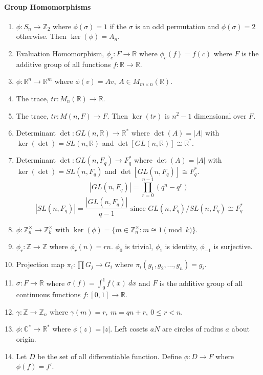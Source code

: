 \paragraph{Group Homomorphisms}
\begin{enumerate}
	\item $\phi : S_n \to \mathbb{Z}_2$ where $\phi(\sigma) = 1$ if the $\sigma$ is an odd permutation and $\phi(\sigma) = 2$ otherwise. Then $\ker(\phi)=A_n$.
	\item Evaluation Homomorphism, $\phi_c : F \to \mathbb{R}$ where $\phi_c(f) = f(c)$ where $F$ is the additive group of all functions $f : \mathbb{R} \to \mathbb{R}$.
	\item $\phi : \mathbb{R}^n \to \mathbb{R}^m$ where $\phi(v) = Av,\ A \in M_{m \times n}(\mathbb{R})$.
	\item The trace, $tr : M_n(\mathbb{R}) \to \mathbb{R}$.
	\item The trace, $tr : M(n,F) \to F$. Then $\ker(tr)$ is $n^2-1$ dimensional over $F$.
	\item Determinant $\det : GL(n,\mathbb{R}) \to \mathbb{R}^\ast$ where $\det(A)=|A|$ with $\ker(\det) = SL(n,\mathbb{R})$ and $\det[GL(n,\mathbb{R})] \cong \mathbb{R}^\ast$.
	\item Determinant $\det : GL(n,F_q) \to F_q^\ast$ where $\det(A)=|A|$ with $\ker(\det) = SL(n,F_q)$ and $\det[GL(n,F_q)] \cong F_q^\ast$.
	$$|GL(n,F_q)| = \prod_{r=0}^{n-1} (q^n-q^r)$$
	$$|SL(n,F_q)| = \frac{|GL(n,F_q)|}{q-1} \text{ since } GL(n,F_q)/SL(n,F_q) \cong F_q^\ast$$
	\item $\phi : \mathbb{Z}_n^\times \to \mathbb{Z}_k^\times$ with $\ker(\phi) = \{ m \in \mathbb{Z}_n^\times : m \cong 1 \pmod{k} \}$.
	\item $\phi_r : \mathbb{Z} \to \mathbb{Z}$ where $\phi_r(n) = rn$. $\phi_0$ is trivial, $\phi_1$ is identity, $\phi_{-1}$ is surjective.
	\item Projection map $\pi_i : \prod G_j \to G_i$ where $\pi_i(g_1,g_2,\dots,g_n) = g_i$.
	\item $\sigma : F \to \mathbb{R}$ where $\sigma(f) = \int_0^1 f(x)\ dx$ and $F$ is the additive group of all continuous functions $f : [0,1] \to \mathbb{R}$.
	\item $\gamma : \mathbb{Z} \to \mathbb{Z}_n$ where $\gamma(m) = r,\ m =qn+r,\ 0 \le r < n$.
	\item $\phi : \mathbb{C}^\ast \to \mathbb{R}^\ast$ where $\phi(z) = |z|$.
	Left cosets $aN$ are circles of radius $a$ about origin.
	\item Let $D$ be the set of all differentiable function. Define $\phi : D \to F$ where $\phi(f) = f'$.

\end{enumerate}
